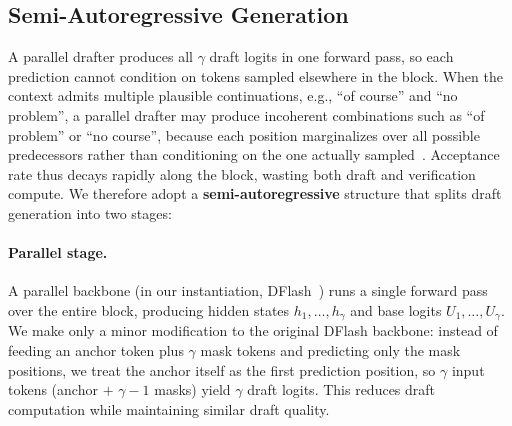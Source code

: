 \subsection{Semi-Autoregressive Generation}
\label{sec:semi_ar}

A parallel drafter produces all $\gamma$ draft logits in one forward pass, so each prediction cannot condition on tokens sampled elsewhere in the block.
When the context admits multiple plausible continuations, e.g., ``of course'' and ``no problem'', a parallel drafter may produce incoherent combinations such as ``of problem'' or ``no course'', because each position marginalizes over all possible predecessors rather than conditioning on the one actually sampled~\citep{gu2018nonautoregressive,pmlr-v162-huang22k}.
Acceptance rate thus decays rapidly along the block, wasting both draft and verification compute.
We therefore adopt a \textbf{semi-autoregressive} structure that splits draft generation into two stages:

\paragraph{Parallel stage.}
A parallel backbone (in our instantiation, DFlash~\citep{chen2026dflash}) runs a single forward pass over the entire block, producing hidden states $h_1, \ldots, h_{\gamma}$ and base logits $U_1, \ldots, U_{\gamma}$.
We make only a minor modification to the original DFlash backbone: instead of feeding an anchor token plus $\gamma$ mask tokens and predicting only the mask positions, we treat the anchor itself as the first prediction position, so $\gamma$ input tokens (anchor $+$ $\gamma{-}1$ masks) yield $\gamma$ draft logits.
This reduces draft computation while maintaining similar draft quality.

